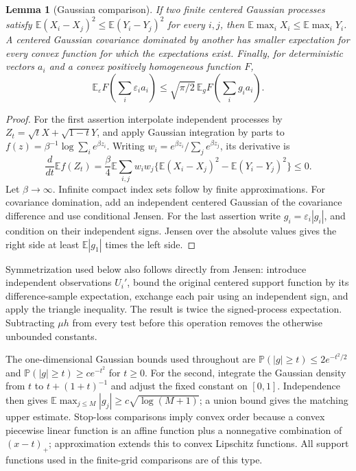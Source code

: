 \documentclass[11pt]{article}
\newtheorem{lemma}[theorem]{Lemma}
\newcommand{\E}{\mathbb E}
\newcommand{\PP}{\mathbb P}
\numberwithin{equation}{section}
\begin{document}
\begin{lemma}[Gaussian comparison]\label{pair:lem:gaussian-comparison}
If two finite centered Gaussian processes satisfy
$\E(X_i-X_j)^2\le\E(Y_i-Y_j)^2$ for every $i,j$, then
$\E\max_iX_i\le\E\max_iY_i$. A centered Gaussian covariance
dominated by another has smaller expectation for every convex function
for which the expectations exist. Finally, for deterministic vectors
$a_i$ and a convex positively homogeneous function $F$,
\[
 \E_\varepsilon F\left(\sum_i\varepsilon_i a_i\right)
 \le\sqrt{\pi/2}\,\E_g F\left(\sum_i g_i a_i\right).
\]
\end{lemma}
\begin{proof}
For the first assertion interpolate independent processes by
$Z_t=\sqrt t X+\sqrt{1-t}Y$, and apply Gaussian integration by
parts to $f(z)=\beta^{-1}\log\sum_i e^{\beta z_i}$.
Writing $w_i=e^{\beta z_i}/\sum_j e^{\beta z_j}$, its derivative is
\[
 \frac d{dt}\E f(Z_t)=\frac\beta4\E\sum_{i,j}w_iw_j
 \{\E(X_i-X_j)^2-\E(Y_i-Y_j)^2\}\le0.
\]
Let $\beta\to\infty$. Infinite compact index sets follow by finite
approximations. For covariance domination, add an independent centered
Gaussian of the covariance difference and use conditional Jensen.
For the last assertion write $g_i=\varepsilon_i|g_i|$, and condition
on their independent signs. Jensen over the absolute values gives
the right side at least $\E|g_1|$ times the left side.
\end{proof}

Symmetrization used below also follows directly from Jensen: introduce
independent observations $U_i'$, bound the original centered support
function by its difference-sample expectation, exchange each pair using
an independent sign, and apply the triangle inequality. The result is
twice the signed-process expectation. Subtracting $\mu h$ from every
test before this operation removes the otherwise unbounded constants.

The one-dimensional Gaussian bounds used throughout are
$\PP(|g|\ge t)\le2e^{-t^2/2}$ and
$\PP(|g|\ge t)\ge c e^{-t^2}$ for $t\ge0$. For the second, integrate
the Gaussian density from $t$ to $t+(1+t)^{-1}$ and adjust the fixed
constant on $[0,1]$. Independence then gives
$\E\max_{j\le M}|g_j|\ge c\sqrt{\log(M+1)}$; a union bound gives
the matching upper estimate. Stop-loss comparisons imply convex
order because a convex piecewise linear function is an affine
function plus a nonnegative combination of $(x-t)_+$; approximation
extends this to convex Lipschitz functions. All support functions
used in the finite-grid comparisons are of this type.
\end{document}
